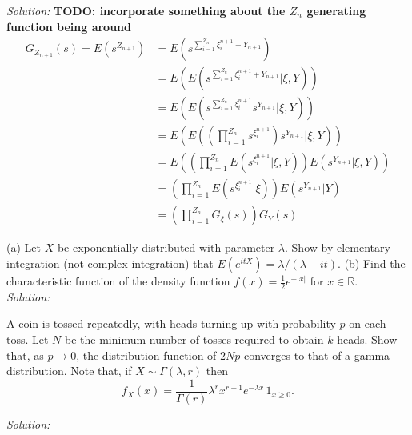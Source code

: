 \documentclass[10pt]{amsart}
\begin{document}
\noindent
\textit{Solution:}
\textbf{TODO: incorporate something about the $Z_n$ generating function being around}
\begin{align*}
G_{Z_{n+1}}(s) = E(s^{Z_{n+1}})
	&= E(s^{\sum_{i=1}^{Z_n} \xi^{n+1}_i + Y_{n+1}}) \\
	&= E( E(s^{\sum_{i=1}^{Z_n} \xi^{n+1}_i + Y_{n+1}}| \xi , Y)) \\
	&= E( E(s^{\sum_{i=1}^{Z_n} \xi^{n+1}_i}s^{Y_{n+1}}| \xi , Y)) \\
	&= E\left( E\left( \left( \prod_{i= 1}^{Z_n}s^{\xi^{n+1}_i} \right) s^{Y_{n+1}} \Bigg| \xi , Y\right)\right) \\
	&= E\left( \left( \prod_{i= 1}^{Z_n} E\left( s^{\xi^{n+1}_i} \bigg| \xi , Y\right) \right) E \left( s^{Y_{n+1}} \big| \xi , Y\right)\right) \\
	&= \left( \prod_{i= 1}^{Z_n} E\left( s^{\xi^{n+1}_i} \bigg| \xi \right) \right) E \left( s^{Y_{n+1}} \big| Y\right) \\
	&= \left( \prod_{i= 1}^{Z_n} G_{\xi}(s)  \right) G_{Y}(s)
\end{align*}

\newpage

 (a) Let $X$ be exponentially distributed with parameter $\lambda$. Show by elementary integration (not complex integration) that $E(e^{itX})=\lambda/(\lambda-i t)$.
(b) Find the characteristic function of the density function $f(x)=\frac{1}{2}e^{-|x|}$ for $x\in \mathds{R}$.
\\

\noindent
\textit{Solution:}

\newpage

 A coin is tossed repeatedly, with heads turning up with probability $p$ on each toss. Let $N$ be the minimum number of tosses required to obtain $k$ heads. Show that, as $p \to 0$, the distribution function of $2Np$ converges to that of a gamma distribution. Note that, if $X \sim \Gamma(\lambda, r )$ then
$$f_X(x) = \frac{1}{\Gamma(r)} \lambda^r x^{r-1} e^{-\lambda x} \, 1_{x \geq 0}.$$

\noindent
\textit{Solution:}
\end{document}
